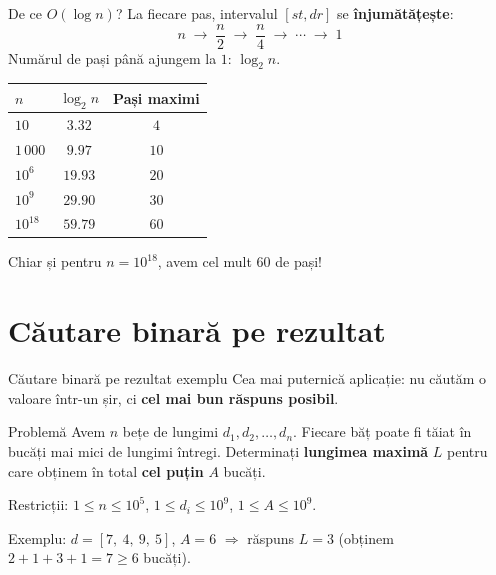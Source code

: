 \documentclass{beamer}
\begin{document}
\begin{frame}{De ce $O(\log n)$?}
  La fiecare pas, intervalul $[st, dr]$ se \textbf{înjumătățește}:
  \[
    n \;\to\; \frac{n}{2} \;\to\; \frac{n}{4} \;\to\; \cdots \;\to\; 1
  \]
  Numărul de pași până ajungem la $1$: $\log_2 n$.

  \smallskip
  \begin{center}
  \begin{tabular}{lcc}
    \toprule
    $n$ & $\log_2 n$ & Pași maximi \\
    \midrule
    $10$              & $3.32$   & $4$  \\
    $1\,000$          & $9.97$   & $10$ \\
    $10^6$            & $19.93$  & $20$ \\
    $10^9$            & $29.90$  & $30$ \\
    $10^{18}$         & $59.79$  & $60$ \\
    \bottomrule
  \end{tabular}
  \end{center}

  \smallskip
  Chiar și pentru $n = 10^{18}$, avem cel mult $60$ de pași!
\end{frame}


\section{Căutare binară pe rezultat}

\begin{frame}{Căutare binară pe rezultat \textemdash{} exemplu}
  Cea mai puternică aplicație: nu căutăm o valoare într-un șir, ci \textbf{cel mai bun răspuns posibil}.

  \smallskip
  \begin{block}{Problemă}
    Avem $n$ bețe de lungimi $d_1, d_2, \dots, d_n$. Fiecare băț poate fi tăiat în bucăți mai mici de lungimi întregi. Determinați \textbf{lungimea maximă} $L$ pentru care obținem în total \textbf{cel puțin} $A$ bucăți.
  \end{block}

  \smallskip
  Restricții: $1 \leq n \leq 10^5$, $1 \leq d_i \leq 10^9$, $1 \leq A \leq 10^9$.

  Exemplu: $d = [7,\ 4,\ 9,\ 5]$, $A = 6$ $\Rightarrow$ răspuns $L = 3$ (obținem $2+1+3+1 = 7 \geq 6$ bucăți).
\end{frame}
\end{document}
